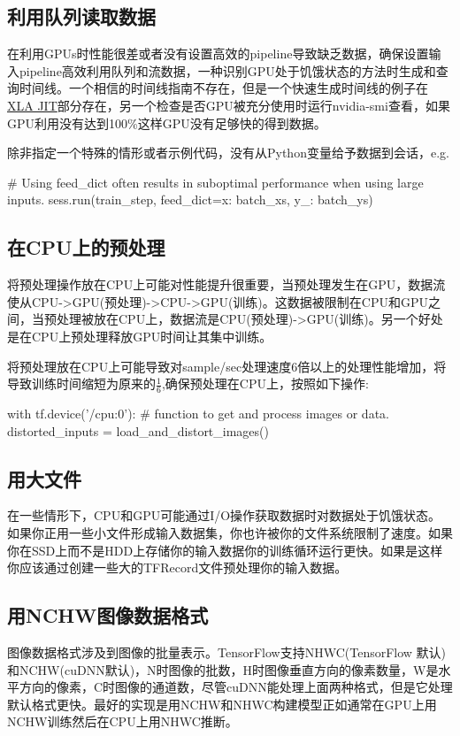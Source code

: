 \subsection{利用队列读取数据}
在利用GPUs时性能很差或者没有设置高效的pipeline导致缺乏数据，确保设置输入pipeline高效利用队列和流数据，一种识别GPU处于饥饿状态的方法时生成和查询时间线。一个相信的时间线指南不存在，但是一个快速生成时间线的例子在\href{https://www.tensorflow.org/performance/xla/jit}{XLA JIT}部分存在，另一个检查是否GPU被充分使用时运行nvidia-smi查看，如果GPU利用没有达到100\%这样GPU没有足够快的得到数据。

除非指定一个特殊的情形或者示例代码，没有从Python变量给予数据到会话，e.g.
\begin{python}
# Using feed_dict often results in suboptimal performance when using large inputs.
sess.run(train_step, feed_dict={x: batch_xs, y_: batch_ys})
\end{python}
\subsection{在CPU上的预处理}
将预处理操作放在CPU上可能对性能提升很重要，当预处理发生在GPU，数据流使从CPU->GPU(预处理)->CPU->GPU(训练)。这数据被限制在CPU和GPU之间，当预处理被放在CPU上，数据流是CPU(预处理)->GPU(训练)。另一个好处是在CPU上预处理释放GPU时间让其集中训练。

将预处理放在CPU上可能导致对sample/sec处理速度6倍以上的处理性能增加，将导致训练时间缩短为原来的$\frac{1}{6}$,确保预处理在CPU上，按照如下操作:
\begin{python}
with tf.device('/cpu:0'):
  # function to get and process images or data.
  distorted_inputs = load_and_distort_images()
\end{python}
\subsection{用大文件}
在一些情形下，CPU和GPU可能通过I/O操作获取数据时对数据处于饥饿状态。如果你正用一些小文件形成输入数据集，你也许被你的文件系统限制了速度。如果你在SSD上而不是HDD上存储你的输入数据你的训练循环运行更快。如果是这样你应该通过创建一些大的TFRecord文件预处理你的输入数据。
\subsection{用NCHW图像数据格式}
图像数据格式涉及到图像的批量表示。TensorFlow支持NHWC(TensorFlow 默认)和NCHW(cuDNN默认)，N时图像的批数，H时图像垂直方向的像素数量，W是水平方向的像素，C时图像的通道数，尽管cuDNN能处理上面两种格式，但是它处理默认格式更快。最好的实现是用NCHW和NHWC构建模型正如通常在GPU上用NCHW训练然后在CPU上用NHWC推断。


